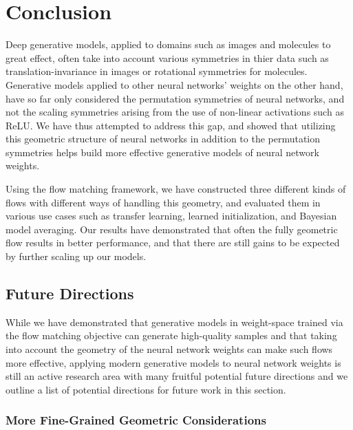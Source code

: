 
\chapter{Conclusion} \label{chapter:discussion}

Deep generative models, applied to domains such as images \citep{esserScalingRectifiedFlow2024b} and molecules \citep{abramsonAccurateStructurePrediction2024} to great effect, often take into account various symmetries in thier data such as translation-invariance in images or rotational symmetries for molecules. Generative models applied to other neural networks' weights on the other hand, have so far only considered the permutation symmetries of neural networks, and not the scaling symmetries arising from the use of non-linear activations such as ReLU. We have thus attempted to address this gap, and showed that utilizing this geometric structure of neural networks in addition to the permutation symmetries helps build more effective generative models of neural network weights. 

Using the flow matching framework, we have constructed three different kinds of flows with different ways of handling this geometry, and evaluated them in various use cases such as transfer learning, learned initialization, and Bayesian model averaging. Our results have demonstrated that often the fully geometric flow results in better performance, and that there are still gains to be expected by further scaling up our models. 

\section{Future Directions}

While we have demonstrated that generative models in weight-space trained via the flow matching objective can generate high-quality samples and that taking into account the geometry of the neural network weights can make such flows more effective, applying modern generative models to neural network weights is still an active research area with many fruitful potential future directions and we outline a list of potential directions for future work in this section. 

\subsection{More Fine-Grained Geometric Considerations}

